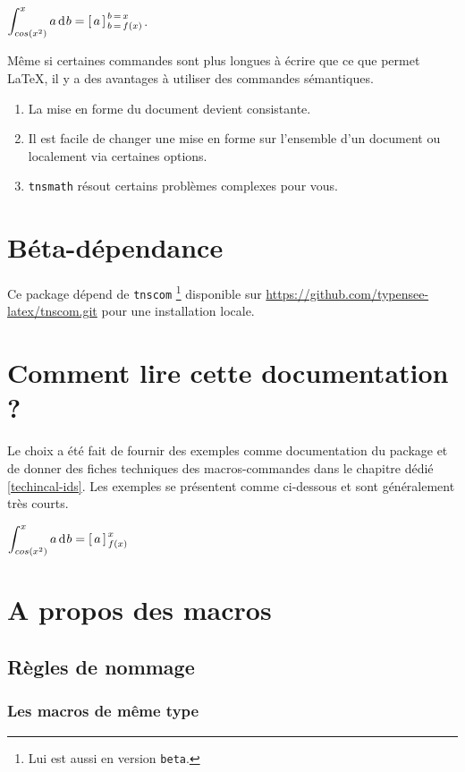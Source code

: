 \documentclass[12pt,a4paper]{book}
\theoremstyle{definition}
\begin{document}
{{\begin{latexex-alone}
$\dintegrate*{a}{b}{cos(x^2)}{x} = \hook{a}{b}{f(x)}{x}$.
\end{latexex-alone}


Même si certaines commandes sont plus longues à écrire que ce que permet \LaTeX{}, il y a des avantages à utiliser des commandes sémantiques.
\begin{enumerate}
	\item La mise en forme du document devient consistante.

	\item Il est facile de changer une mise en forme sur l'ensemble d'un document ou localement via certaines options.

	\item \verb+tnsmath+ résout certains problèmes \og complexes \fg{} pour vous.
\end{enumerate}




\section{Béta-dépendance}

Ce package dépend de \verb+tnscom+
\footnote{
	Lui est aussi en version \texttt{beta}.
}
disponible sur \url{https://github.com/typensee-latex/tnscom.git} pour une installation locale.
\section{Comment lire cette documentation ?}

Le choix a été fait de fournir des exemples comme documentation du package et de donner des fiches techniques des macros-commandes dans le chapitre dédié \ref{techincal-ids}.
Les exemples se présentent comme ci-dessous et sont généralement très courts.

\begin{latexex}
$\dintegrate*{a}{b}{cos(x^2)}{x}
 =
 \hook*{a}{b}{f(x)}{x}$
\end{latexex}
\section{A propos des macros}

\subsection{Règles de nommage}

\subsubsection{Les macros de même \og type \fg}

}}
\end{document}
